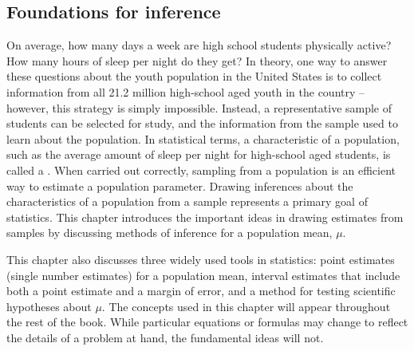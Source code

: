 
\begin{spacing}{1.5}

\chapter{Foundations for inference}
\label{foundationsForInference}

On average, how many days a week are high school students physically active? How many hours of sleep per night do they get? In theory, one way to answer these questions about the youth population in the United States is to collect information from all 21.2 million high-school aged youth in the country -- however, this strategy is simply impossible. Instead, a representative sample of students can be selected for study, and the information from the sample used to learn about the population. In statistical terms, a characteristic of a population, such as the average amount of sleep per night for high-school aged students, is called a . When carried out correctly, sampling from a population is an efficient way to estimate a population parameter. Drawing inferences about the characteristics of a population from a sample represents a primary goal of statistics. This chapter introduces the important ideas in drawing estimates from samples by discussing methods of inference for a population mean, $\mu$. 

This chapter also discusses three widely used tools in statistics: point estimates (single number estimates) for a population mean, interval estimates that include both a point estimate and a margin of error, and a method for testing scientific hypotheses about $\mu$. The concepts used in this chapter will appear throughout the rest of the book. While particular equations or formulas may change to reflect the details of a problem at hand, the fundamental ideas will not. 



\end{spacing}
